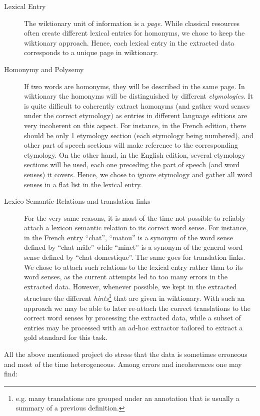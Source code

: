 \documentclass[10pt, a4paper]{article}
\begin{document}
\begin{description}
\item[Lexical Entry] The wiktionary unit of information is a \emph{page}. While classical resources often create different lexical entries for homonyms, we chose to keep the wiktionary approach. Hence, each lexical entry in the extracted data corresponds to a unique page in wiktionary.
\item[Homonymy and Polysemy] If two words are homonyms, they will be described in the same page. In wiktionary the homonyms will be distinguished by different \emph{etymologies}. It is quite difficult to coherently extract homonyms (and gather word senses under the correct etymology) as entries in different language editions are very incoherent on this aspect. For instance, in the French edition, there should be only 1 etymology section (each etymology being numbered), and other part of speech sections will make reference to the corresponding etymology. On the other hand, in the English edition, several etymology sections will be used, each one preceding the part of speech (and word senses) it covers. Hence, we chose to ignore etymology and gather all word senses in a flat list in the lexical entry.
\item[Lexico Semantic Relations and translation links] For the very same reasons, it is most of the time not possible to reliably attach a lexicon semantic relation to its correct word sense. For instance, in the French entry ``chat'', ``matou'' is a synonym  of the word sense defined by ``chat mâle'' while ``minet'' is a synonym of the general word sense defined by ``chat domestique''. The same goes for translation links. We chose to attach such relations to the lexical entry rather than to its word senses, as the current attempts led to too many errors in the extracted data. However, whenever possible, we kept in the extracted structure the different \emph{hints}\footnote{e.g. many translations are grouped under an annotation that is usually a summary of a previous definition.} that are given in wiktionary. With such an approach we may be able to later re-attach the correct translations to the correct word senses by processing the extracted data, while a subset of entries may be processed with an ad-hoc extractor tailored to extract a gold standard for this task. 
\end{description}

All the above mentioned project do stress that the data is sometimes erroneous and most of the time heterogeneous. Among errors and incoherences one may find:
\end{document}
